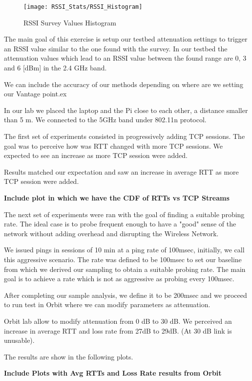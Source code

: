 \begin{figure}[h]
	\centering
	\texttt{[image: RSSI\_Stats/RSSI\_Histogram]}
	\caption{RSSI Survey Values Histogram}
	\label{fig:vSDN_Controller_DC}
\end{figure}


The main goal of this exercise is setup our testbed attenuation settings to trigger an RSSI value similar to the one found with the survey. In our testbed the attenuation values which lead to an RSSI value between the found range are 0, 3 and 6 [dBm] in the 2.4 GHz band.


We can include the accuracy of our methods depending on where are we setting our Vantage point.ex

In our lab we placed the laptop and the Pi close to each other, a distance smaller than 5 m. We connected to the 5GHz band under 802.11n protocol.

The first set of experiments consisted in progressively adding TCP sessions. The goal was to perceive how was RTT changed with more TCP sessions. We expected to see an increase as more TCP session were added.

Results matched our expectation and saw an increase in average RTT as more TCP session were added.

\textbf{Include plot in which we have the CDF of RTTs vs TCP Streams}

The next set of experiments were ran with the goal of finding a suitable probing rate. The ideal case is to probe frequent enough to have a "good" sense of the network without adding overhead and disrupting the Wireless Network.

We issued pings in sessions of 10 min at a ping rate of 100msec, initially, we call this aggressive scenario. The rate was defined to be 100msec to set our baseline from which we derived our sampling to obtain a suitable probing rate. The main goal is to achieve a rate which is not as aggressive as probing every 100msec.

After completing our sample analysis, we define it to be 200msec and we proceed to run test in Orbit where we can modify parameters as attenuation.

Orbit lab allow to modify attenuation from 0 dB to 30 dB. We perceived an increase in average RTT and loss rate from 27dB to 29dB. (At 30 dB link is unusable).

The results are show in the following plots.

\textbf{Include Plots with Avg RTTs and Loss Rate results from Orbit}




